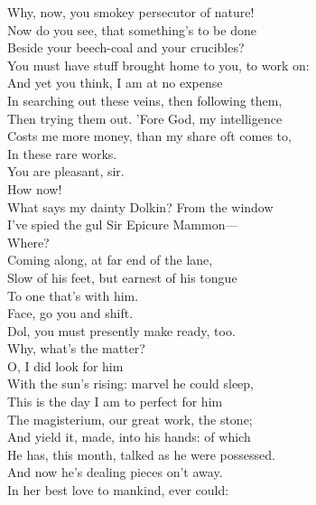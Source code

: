 \documentclass[a4paper,oneside,12pt]{memoir}
\begin{document}
\begin{drama*}
\facespeaks Why, now, you smokey persecutor of nature!\\
Now do you see, that something's to be done\\
Beside your beech-coal and your crucibles?\\
You must have stuff brought home to you, to work on:\\
And yet you think, I am at no expense\\
In searching out these veins, then following them,\\
Then trying them out. 'Fore God, my intelligence\\
Costs me more money, than my share oft comes to,\\
In these rare works.\\
\subtlespeaks {} You are pleasant, sir.\\
 How now!\\
\facespeaks What says my dainty Dolkin?
\dolspeaks {} From the window\\
I've spied the gul Sir Epicure Mammon---\\
\subtlespeaks {} Where?\\
\dolspeaks Coming along, at far end of the lane,\\
Slow of his feet, but earnest of his tongue\\
To one that's with him.\\
\subtlespeaks {} Face, go you and shift.\\
Dol, you must presently make ready, too.\\
\dolspeaks Why, what's the matter?\\
\subtlespeaks {} O, I did look for him\\
With the sun's rising: marvel he could sleep,\\
This is the day I am to perfect for him\\
The magisterium, our great work, the stone;\\
And yield it, made, into his hands: of which\\
He has, this month, talked as he were possessed.\\
And now he's dealing pieces on't away.\\
In her best love to mankind, ever could:\\

\end{drama*}
\end{document}
